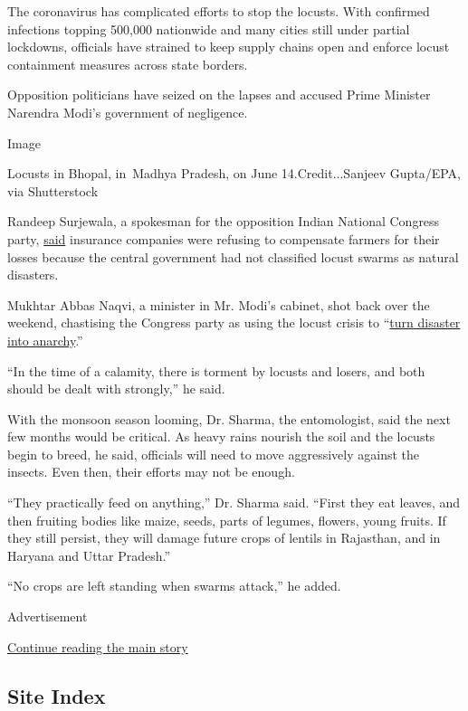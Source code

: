 The coronavirus has complicated efforts to stop the locusts. With
confirmed infections topping 500,000 nationwide and many cities still
under partial lockdowns, officials have strained to keep supply chains
open and enforce locust containment measures across state borders.

Opposition politicians have seized on the lapses and accused Prime
Minister Narendra Modi's government of negligence.

Image

Locusts in Bhopal, in~Madhya Pradesh, on June 14.Credit...Sanjeev
Gupta/EPA, via Shutterstock

Randeep Surjewala, a spokesman for the opposition Indian National
Congress party,
\href{https://www.news18.com/news/politics/congress-asks-govt-to-declare-locust-attacks-as-natural-disaster-seeks-aid-for-farmers-2691735.html}{said}
insurance companies were refusing to compensate farmers for their losses
because the central government had not classified locust swarms as
natural disasters.

Mukhtar Abbas Naqvi, a minister in Mr. Modi's cabinet, shot back over
the weekend, chastising the Congress party as using the locust crisis to
``\href{https://www.newindianexpress.com/nation/2020/jun/28/country-tormented-by-locusts-and-losers-union-minister-mukhtar-abbas-naqvi-s-jibe-at-congress-2162588.html}{turn
disaster into anarchy}.''

``In the time of a calamity, there is torment by locusts and losers, and
both should be dealt with strongly,'' he said.

With the monsoon season looming, Dr. Sharma, the entomologist, said the
next few months would be critical. As heavy rains nourish the soil and
the locusts begin to breed, he said, officials will need to move
aggressively against the insects. Even then, their efforts may not be
enough.

``They practically feed on anything,'' Dr. Sharma said. ``First they eat
leaves, and then fruiting bodies like maize, seeds, parts of legumes,
flowers, young fruits. If they still persist, they will damage future
crops of lentils in Rajasthan, and in Haryana and Uttar Pradesh.''

``No crops are left standing when swarms attack,'' he added.

Advertisement

\protect\hyperlink{after-bottom}{Continue reading the main story}

\hypertarget{site-index}{%
\subsection{Site Index}\label{site-index}}

